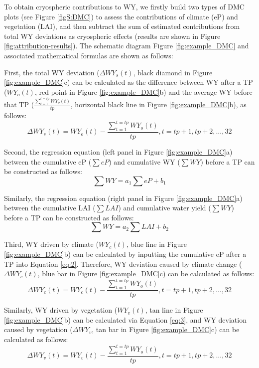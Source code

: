 \documentclass[hess, manuscript]{copernicus}
\begin{document}
To obtain cryospheric contributions to WY, we firstly build two types of DMC plots (see Figure \ref{figS:DMC}) to assess the contributions of climate (eP) and vegetation (LAI), and then subtract the sum of estimated contributions from total WY deviations as cryospheric effects (results are shown in Figure \ref{fig:attribution-results}). The schematic diagram Figure \ref{fig:example_DMC} and associated mathematical formulas are shown as follows:

First, the total WY deviation ($\Delta WY_s(t)$, black diamond in Figure \ref{fig:example_DMC}c) can be calculated as the difference between WY after a TP ($WY_o(t)$, red point in Figure \ref{fig:example_DMC}b) and the average WY before that TP ($\frac{\sum_{t=1}^{t=tp}WY_o(t)} {tp}$, horizontal black line in Figure \ref{fig:example_DMC}b), as follows:
\begin{equation} 
    \Delta WY_s(t)=WY_o(t)-\frac{\sum_{t=1}^{t=tp} WY_o(t)}{tp}, t=tp+1, tp+2, \ldots, 32
\end{equation}

Second, the regression equation (left panel in Figure \ref{fig:example_DMC}a) between the cumulative eP ($\sum eP$) and cumulative WY ($\sum WY$) before a TP can be constructed as follows:
\begin{equation} \label{eq:2}
    \sum WY = a_1\sum eP + b_1
\end{equation}

Similarly, the regression equation (right panel in Figure \ref{fig:example_DMC}a) between the cumulative LAI ($\sum LAI$) and cumulative water yield ($\sum WY$) before a TP can be constructed as follows:
\begin{equation} \label{eq:3}
    \sum WY = a_2\sum LAI + b_2
\end{equation}

Third, WY driven by climate ($WY_c(t)$, blue line in Figure \ref{fig:example_DMC}b) can be calculated by inputting the cumulative eP after a TP into Equation \ref{eq:2}. Therefore, WY deviation caused by climate change ($\Delta WY_c(t)$, blue bar in Figure \ref{fig:example_DMC}c) can be calculated as follows:
\begin{equation}
    \Delta WY_{c}(t)=WY_{c}(t)-\frac{\sum_{t=1}^{t=tp}WY_o(t)}{tp}, t=tp+1, tp+2, \ldots, 32
\end{equation}

Similarly, WY driven by vegetation ($WY_v(t)$, tan line in Figure \ref{fig:example_DMC}b) can be calculated via Equation \ref{eq:3}, and WY deviation caused by vegetation ($\Delta WY_v$, tan bar in Figure \ref{fig:example_DMC}c) can be calculated as follows:
\begin{equation}
    \Delta WY_{v}(t)=WY_{v}(t)-\frac{\sum_{t=1}^{t=tp}WY_o(t)}{tp}, t=tp+1, tp+2, \ldots, 32
\end{equation}
\end{document}
